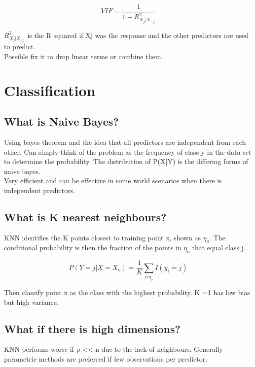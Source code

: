 \documentclass[11pt]{scrartcl} %
\begin{document}
\begin{equation}
	VIF = \frac{1}{1 - R^2_{X_j|X_{-j}}}
\end{equation}

\(R^2_{X_j|X_{-j}}\) is the R squared if Xj was the response and the other predictors are used to predict.\\

Possible fix it to drop linear terms or combine them.

\section{Classification}

\subsection{What is Naive Bayes?}

Using bayes theorem and the idea that all predictors are independent from each other.
Can simply think of the problem as the frequency of class y in the data set to determine the
probability. The distribution of P(X|Y) is the differing forms of naive bayes.\\

Very efficient and can be effective in some world scenarios when there is independent predictors.

\subsection{What is K nearest neighbours?}

KNN identifies the K points closest to training point x, shown as \(\eta_o\). The conditional probability is then
the fraction of the points in \(\eta_o\) that equal class j.

\begin{equation}
	P(Y=j|X=X_o) = \frac{1}{K}\sum_{i\epsilon \eta_o}{I(y_i=j)}
\end{equation}

Then classify point x as the class with the highest probability. K =1 has low bias but high variance.

\subsection{What if there is high dimensions?}

KNN performs worse if p << n due to the lack of neighbours. Generally parametric methods are preferred if
few observations per predictor.
\end{document}
